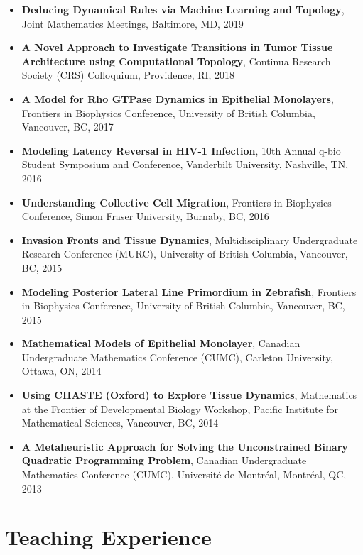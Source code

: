 \documentclass[margin,line]{res}
\begin{document}
\begin{resume}
{\begin{itemize}
\item {\bf Deducing Dynamical Rules via Machine Learning and Topology}, Joint Mathematics Meetings, Baltimore, MD, 2019

\item {\bf A Novel Approach to Investigate Transitions in Tumor Tissue Architecture using Computational Topology}, Continua Research Society (CRS) Colloquium, Providence, RI, 2018

\item {\bf A Model for Rho GTPase Dynamics in Epithelial Monolayers}, Frontiers in Biophysics Conference, University of British Columbia, Vancouver, BC, 2017

\item {\bf Modeling Latency Reversal in HIV-1 Infection}, 10th Annual q-bio Student Symposium and Conference, Vanderbilt University, Nashville, TN, 2016

\item {\bf Understanding Collective Cell Migration}, Frontiers in Biophysics Conference, Simon Fraser University, Burnaby, BC, 2016

\item {\bf Invasion Fronts and Tissue Dynamics}, Multidisciplinary Undergraduate Research Conference (MURC), University of British Columbia, Vancouver, BC, 2015

\item {\bf Modeling Posterior Lateral Line Primordium in Zebrafish}, Frontiers in Biophysics Conference, University of British Columbia, Vancouver, BC, 2015

\item {\bf Mathematical Models of Epithelial Monolayer}, Canadian Undergraduate Mathematics Conference (CUMC), Carleton University, Ottawa, ON, 2014

\item {\bf Using CHASTE (Oxford) to Explore Tissue Dynamics}, Mathematics at the Frontier of Developmental Biology Workshop, Pacific Institute for Mathematical Sciences, Vancouver, BC, 2014

\item {\bf A Metaheuristic Approach for Solving the Unconstrained Binary Quadratic Programming Problem}, Canadian Undergraduate Mathematics Conference (CUMC), Universit\'e de Montr\'eal, Montr\'eal, QC, 2013
\end{itemize}
}

\vspace*{.3cm}

\section{\sc Teaching Experience}


\end{resume}
\end{document}
